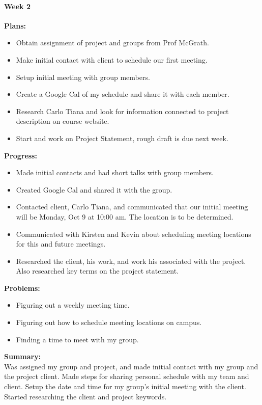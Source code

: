 \paragraph{Week 2}
\begin{adjustwidth}{2.5em}{0pt}
    \vspace{-0.5cm}\textbf{Plans:}
    \vspace{-0.5cm}
    \begin{itemize}
        \item Obtain assignment of project and groups from Prof McGrath. 
        \item Make initial contact with client to schedule our first meeting. 
        \item Setup initial meeting with group members. 
        \item Create a Google Cal of my schedule and share it with each member.
        \item Research Carlo Tiana and look for information connected to project description on course website. 
        \item Start and work on Project Statement, rough draft is due next week.  
    \end{itemize} 
    \vspace{-0.3cm}\textbf{Progress:}
    \vspace{-0.5cm}
    \begin{itemize}
        \item Made initial contacts and had short talks with group members. 
        \item Created Google Cal and shared it with the group. 
        \item Contacted client, Carlo Tiana, and communicated that our initial meeting will be Monday, Oct 9 at 10:00 am. The location is to be determined. 
        \item Communicated with Kirsten and Kevin about scheduling meeting locations for this and future meetings. 
        \item Researched the client, his work, and work his associated with the project. Also researched key terms on the project statement. 
    \end{itemize} 
    \vspace{-0.3cm}\textbf{Problems:}
    \vspace{-0.5cm}
    \begin{itemize}
        \item Figuring out a weekly meeting time.
	    \item Figuring out how to schedule meeting locations on campus.
  		\item Finding a time to meet with my group.
    \end{itemize}  
    \vspace{-0.3cm}\noindent\textbf{Summary:}\\
    \noindent Was assigned my group and project, and made initial contact with my group and the project client. Made steps for sharing personal schedule with my team and client. Setup the date and time for my group's initial meeting with the client. Started researching the client and project keywords. 
\end{adjustwidth} 

